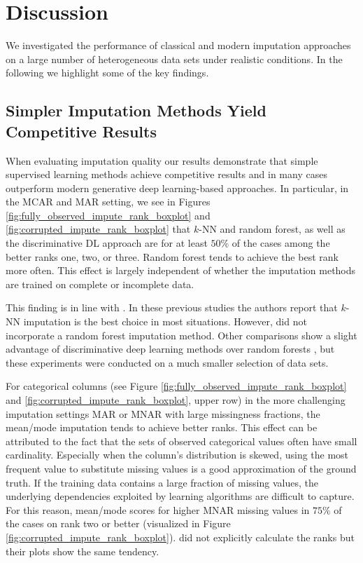 \section{Discussion}
\label{sec:discussion}

We investigated the performance of classical and modern imputation approaches on a large number of heterogeneous data sets under realistic conditions. In the following we highlight some of the key findings.

\subsection{Simpler Imputation Methods Yield Competitive Results}
%
When evaluating imputation quality our results demonstrate that simple supervised learning methods achieve competitive results and in many cases outperform modern generative deep learning-based approaches. In particular, in the MCAR and MAR setting, we see in Figures \ref{fig:fully_observed_impute_rank_boxplot} and \ref{fig:corrupted_impute_rank_boxplot} that $k$-NN and random forest, as well as the discriminative DL approach are for at least $50\%$ of the cases among the better ranks one, two, or three. Random forest tends to achieve the best rank more often. This effect is largely independent of whether the imputation methods are trained on complete or incomplete data.

This finding is in line with \cite{Imputation_Benchmark_3, Imputation_Benchmark_2, Imputation_Benchmark_4}. In these previous studies the authors report that $k$-NN imputation is the best choice in most situations. However, \cite{Imputation_Benchmark_2, Imputation_Benchmark_4} did not incorporate a random forest imputation method. Other comparisons show a slight advantage of discriminative deep learning methods over random forests \citep{biessmann2019datawig}, but these experiments were conducted on a much smaller selection of data sets.

For categorical columns (see Figure \ref{fig:fully_observed_impute_rank_boxplot} and \ref{fig:corrupted_impute_rank_boxplot}, upper row) in the more challenging imputation settings MAR or MNAR with large missingness fractions, the mean/mode imputation tends to achieve better ranks. This effect can be attributed to the fact that the sets of observed categorical values often have small cardinality. Especially when the column's distribution is skewed, using the most frequent value to substitute missing values is a good approximation of the ground truth. If the training data contains a large fraction of missing values, the underlying dependencies exploited by learning algorithms are difficult to capture. For this reason, mean/mode scores for higher MNAR missing values in $75\%$ of the cases on rank two or better (visualized in Figure \ref{fig:corrupted_impute_rank_boxplot}). \cite{Imputation_Benchmark_3} did not explicitly calculate the ranks but their plots show the same tendency.

